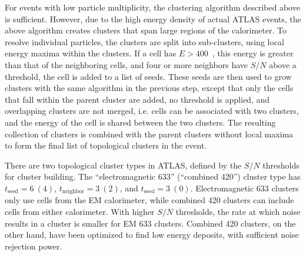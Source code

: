 For events with low particle multiplicity, the clustering algorithm
described above is sufficient. However, due to the high energy density
of actual ATLAS events, the above algorithm creates clusters
that span large regions of the calorimeter. To resolve individual
particles, the clusters are split into sub-clusters, using local energy
maxima within the clusters. If a cell has $E > 400$~\mev, this energy
is greater than that of the neighboring cells, and four or more
neighbors have $S/N$ above a threshold, the cell is added to a list of
seeds. These seeds are then used to grow clusters with the same
algorithm in the previous step, except that only the cells that fall
within the parent cluster are added, no threshold is applied, and
overlapping clusters are not merged, i.e. cells can be associated with
two clusters, and the energy of the cell is shared between the two
clusters. The resulting collection of clusters is combined with
the parent clusters without local maxima to form the final list of
topological clusters in the event. 

There are two topological cluster types in ATLAS, defined by
the $S/N$ thresholds for cluster building. The ``electromagnetic 633''
(``combined 420'') cluster type has $t_{\textrm{seed}}=6~(4)$,
$t_{\textrm{neighbor}}=3~(2)$, and $t_{\textrm{seed}}=3~(0)$. Electromagnetic
633 clusters only use cells from the EM calorimeter, while combined
420 clusters can include cells from either calorimeter. With higher
$S/N$ thresholds, the rate at which noise results in a cluster is
smaller for EM 633 clusters. Combined 420 clusters, on the other hand,
have been optimized to find low energy deposits, with sufficient noise
rejection power. 
